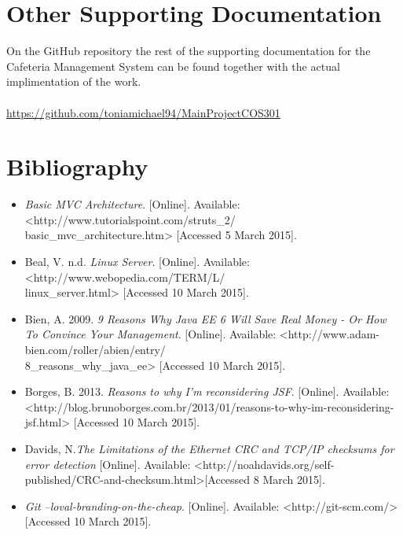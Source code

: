 \documentclass[a4paper,12pt]{article}
\begin{document}
\section{Other Supporting Documentation}

On the GitHub repository the rest of the supporting documentation for the Cafeteria Management System can be found together with the actual implimentation of the work. \\\\
 \url{https://github.com/toniamichael94/MainProjectCOS301}

\newpage
\section{Bibliography}
		\begin{itemize}
			\item \textit{Basic MVC Architecture}. [Online]. Available: <http://www.tutorialspoint.com/struts\_2/\\basic\_mvc\_architecture.htm> [Accessed 5 March 2015].
			
			\item Beal, V. n.d. \textit{Linux Server}. [Online]. Available: <http://www.webopedia.com/TERM/L/\\linux\_server.html> [Accessed 10 March 2015].

			\item Bien, A. 2009. \textit{9 Reasons Why Java EE 6 Will Save Real Money - Or How To Convince Your Management}. [Online]. Available: <http://www.adam-bien.com/roller/abien/entry/\\8\_reasons\_why\_java\_ee> [Accessed 10 March 2015].

			\item Borges, B. 2013. \textit{Reasons to why I'm reconsidering JSF}. [Online]. Available: <http://blog.brunoborges.com.br/2013/01/reasons-to-why-im-reconsidering-jsf.html> [Accessed 10 March 2015].
			
			\item Davids, N.\textit{The Limitations of the Ethernet CRC and TCP/IP checksums for error detection} [Online]. Available: 
			<http://noahdavids.org/self-published/CRC-and-checksum.html>[Accessed 8 March 2015].

			\item \textit{Git --loval-branding-on-the-cheap}. [Online]. Available: <http://git-scm.com/> [Accessed 10 March 2015].


\end{itemize}
\end{document}
